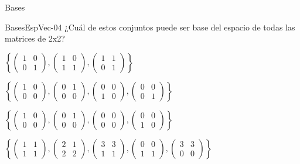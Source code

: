 \documentclass[a4,11pt]{aleph-notas}
\begin{document}
\begin{quiz}{Bases}
\begin{multi}[]%
    {BasesEspVec-04}
    ¿Cuál de estos conjuntos puede ser base del espacio de todas las matrices de 2x2?
    \item $\left\{ \begin{pmatrix} 1 & 0 \\ 0 & 1 \end{pmatrix}, \begin{pmatrix} 1 & 0 \\ 1 & 1 \end{pmatrix}, \begin{pmatrix} 1 & 1 \\ 0 & 1 \end{pmatrix} \right\}$
    \item $\left\{ \begin{pmatrix} 1 & 0 \\ 0 & 0 \end{pmatrix}, \begin{pmatrix} 0 & 1 \\ 0 & 0 \end{pmatrix}, \begin{pmatrix} 0 & 0 \\ 1 & 0 \end{pmatrix}, \begin{pmatrix} 0 & 0 \\ 0 & 1 \end{pmatrix} \right\}$
    \item $\left\{ \begin{pmatrix} 1 & 0 \\ 0 & 0 \end{pmatrix}, \begin{pmatrix} 0 & 1 \\ 0 & 0 \end{pmatrix}, \begin{pmatrix} 0 & 0 \\ 0 & 0 \end{pmatrix}, \begin{pmatrix} 0 & 0 \\ 1 & 0 \end{pmatrix} \right\}$
    \item* $\left\{ \begin{pmatrix} 1 & 1 \\ 1 & 1 \end{pmatrix}, \begin{pmatrix} 2 & 1 \\ 2 & 2 \end{pmatrix}, \begin{pmatrix} 3 & 3 \\ 1 & 1 \end{pmatrix}, \begin{pmatrix} 0 & 0 \\ 1 & 1 \end{pmatrix}, \begin{pmatrix} 3 & 3 \\ 0 & 0 \end{pmatrix} \right\}$
\end{multi}

\end{quiz}
\end{document}
